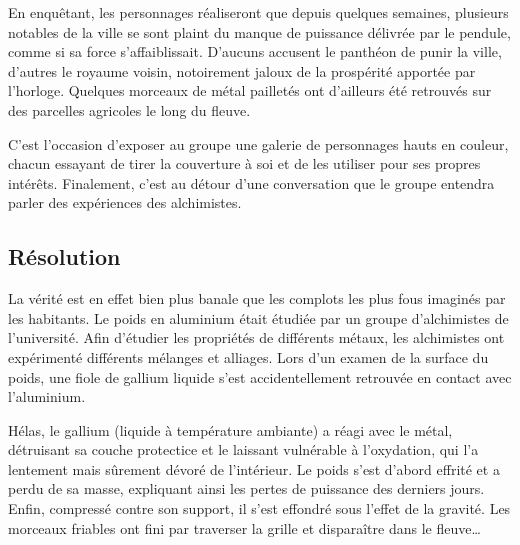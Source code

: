 En enquêtant, les personnages réaliseront que depuis quelques semaines, plusieurs notables de la ville se sont plaint du manque de puissance délivrée par le pendule, comme si sa force s'affaiblissait.
D'aucuns accusent le panthéon de punir la ville, d'autres le royaume voisin, notoirement jaloux de la prospérité apportée par l'horloge.
Quelques morceaux de métal pailletés ont d'ailleurs été retrouvés sur des parcelles agricoles le long du fleuve.

C'est l'occasion d'exposer au groupe une galerie de personnages hauts en couleur, chacun essayant de tirer la couverture à soi et de les utiliser pour ses propres intérêts.
Finalement, c'est au détour d'une conversation que le groupe entendra parler des expériences des alchimistes.

\subsection{Résolution}

La vérité est en effet bien plus banale que les complots les plus fous imaginés par les habitants.
Le poids en aluminium était étudiée par un groupe d'alchimistes de l'université.
Afin d'étudier les propriétés de différents métaux, les alchimistes ont expérimenté différents mélanges et alliages.
Lors d'un examen de la surface du poids, une fiole de gallium liquide s'est accidentellement retrouvée en contact avec l'aluminium.

Hélas, le gallium (liquide à température ambiante) a réagi avec le métal, détruisant sa couche protectice et le laissant vulnérable à l'oxydation, qui l'a lentement mais sûrement dévoré de l'intérieur.
Le poids s'est d'abord effrité et a perdu de sa masse, expliquant ainsi les pertes de puissance des derniers jours.
Enfin, compressé contre son support, il s'est effondré sous l'effet de la gravité.
Les morceaux friables ont fini par traverser la grille et disparaître dans le fleuve\dots

